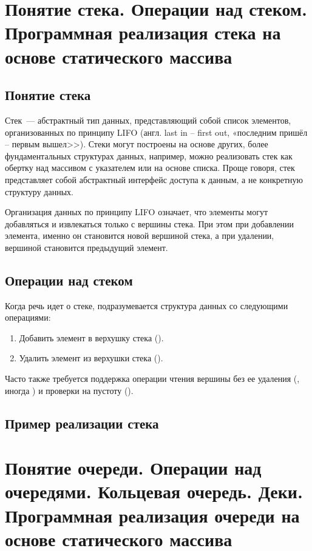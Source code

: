 \section{Понятие стека. Операции над стеком. Программная реализация стека на основе статического массива}
\subsection{Понятие стека}
Стек~--- абстрактный тип данных, представляющий собой список элементов, организованных по принципу
LIFO (англ. last in -- first out, «последним пришёл -- первым вышел>>). Стеки могут построены на основе других, более фундаментальных
структурах данных, например, можно реализовать стек как обертку над массивом с указателем или на основе списка. Проще говоря, стек представляет
собой абстрактный интерфейс доступа к данным, а не конкретную структуру данных.

Организация данных по принципу LIFO означает, что элементы могут добавляться и извлекаться только с вершины стека. При этом при добавлении
элемента, именно он становится новой вершиной стека, а при удалении, вершиной становится предыдущий элемент.

\subsection{Операции над стеком}
Когда речь идет о стеке, подразумевается структура данных со следующими операциями:
\begin{enumerate}
    \item Добавить элемент в верхушку стека ().
    \item Удалить элемент из верхушки стека ().
\end{enumerate}

Часто также требуется поддержка операции чтения вершины без ее удаления (, иногда ) и
проверки на пустоту ().

\subsection{Пример реализации стека}

\section{Понятие очереди. Операции над очередями. Кольцевая очередь. Деки.  Программная реализация очереди на основе статического массива}
